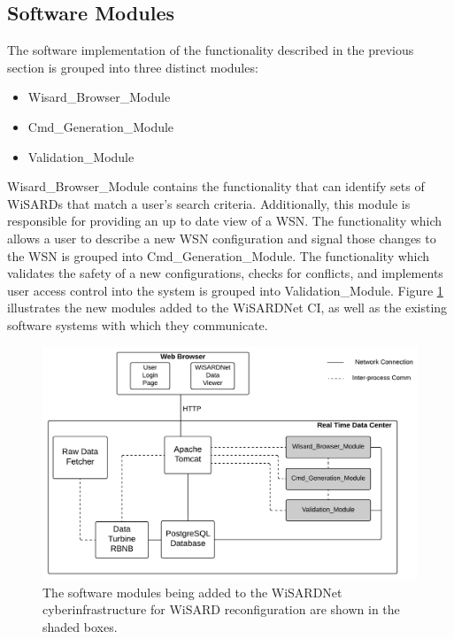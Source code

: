
\subsection{Software Modules}
The software implementation of the functionality described in the previous section is grouped into three distinct modules:

\begin{itemize}
	\item Wisard\_Browser\_Module
	\item Cmd\_Generation\_Module
	\item Validation\_Module
\end{itemize}

Wisard\_Browser\_Module contains the functionality that can identify sets of WiSARDs that match a user's search criteria. Additionally, this module is responsible for providing an up to date view of a WSN. The functionality which allows a user to describe a new WSN configuration and signal those changes to the WSN is grouped into Cmd\_Generation\_Module. The functionality which validates the safety of a new configurations, checks for conflicts, and implements user access control into the system is grouped into Validation\_Module. Figure \ref{fig:wisardnet_ci_additions} illustrates the new modules added to the WiSARDNet CI, as well as the existing software systems with which they communicate.

\begin{figure}[H]
	\centering
	\includegraphics[width=\textwidth]{figures/wisardnet_added_modules.png}
	\caption{The software modules being added to the WiSARDNet cyberinfrastructure for WiSARD reconfiguration are shown in the shaded boxes. }
	\label{fig:wisardnet_ci_additions}
\end{figure}

